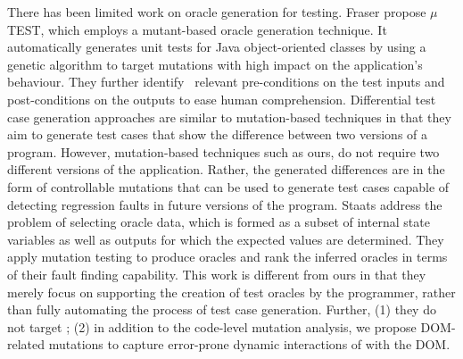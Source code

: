  \label{Sec:oracleGen}
There has been limited work on oracle generation for testing. 
Fraser \etal \cite{fraser:tse12} propose $\mu$TE\-ST, which employs a mutant-based oracle generation technique.  It automatically generates unit tests for Java object-oriented classes by using a genetic algorithm to target mutations with high impact on the application's behaviour. They further identify~\cite{fraser:issta11} relevant pre-conditions on the test inputs and post-conditions on the outputs to ease human comprehension.
Differential test case generation approaches \cite{taneja:ase08, elbaum:tse09} are similar to mutation-based techniques in that they aim to generate test cases that show the difference between two versions of a program. However, mutation-based techniques such as ours, do not require two different versions of the application.
Rather, the generated differences are in the form of controllable mutations that can be used to generate test cases capable of detecting
regression faults in future versions of the program.
Staats \etal \cite{staats:icse11} address the problem of selecting oracle data,  which is formed as a subset of internal state variables as well as outputs for which the expected values are determined.
They apply mutation testing to produce oracles and rank the inferred oracles in terms of their fault finding capability.
This work is different from ours in that they merely focus on supporting the creation of test oracles by the programmer, rather than fully automating the process of test case generation. Further, (1) they do not target \javascript; 
(2) in addition to the code-level mutation analysis, we propose DOM-related mutations to capture error-prone \cite{Ocariza:esem2013} dynamic interactions of \javascript with the DOM.  


